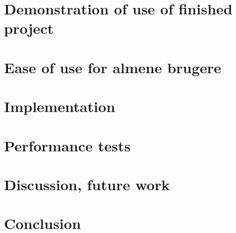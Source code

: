 \documentclass[11pt]{article}
\begin{document}
\section{Demonstration of use of finished project}


\section{Ease of use for almene brugere}

\section{Implementation}

\section{Performance tests}






\section{Discussion, future work}



\section{Conclusion}
\end{document}
